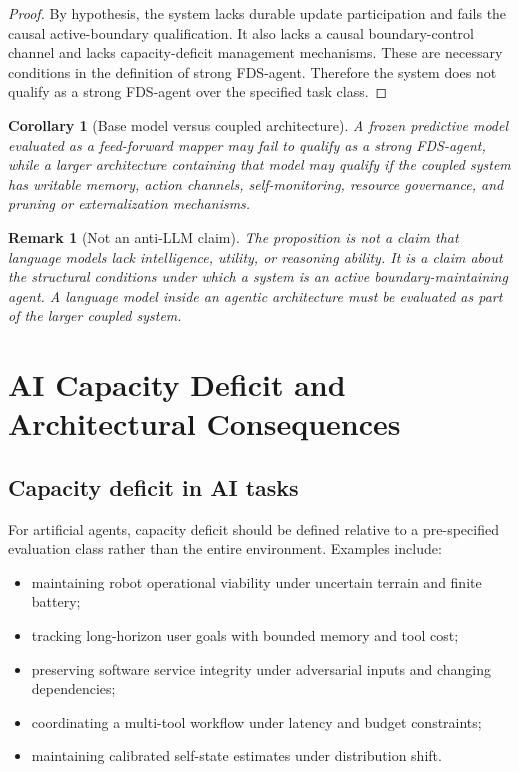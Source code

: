 \documentclass[10pt,a4paper,twocolumn,aps,prl]{revtex4-2}
\newtheorem{corollary}{Corollary}
\newtheorem{remark}{Remark}
\begin{document}
\begin{proof}
By hypothesis, the system lacks durable update participation and fails the causal active-boundary qualification. It also lacks a causal boundary-control channel and lacks capacity-deficit management mechanisms. These are necessary conditions in the definition of strong FDS-agent. Therefore the system does not qualify as a strong FDS-agent over the specified task class.
\end{proof}

\begin{corollary}[Base model versus coupled architecture]
A frozen predictive model evaluated as a feed-forward mapper may fail to qualify as a strong FDS-agent, while a larger architecture containing that model may qualify if the coupled system has writable memory, action channels, self-monitoring, resource governance, and pruning or externalization mechanisms.
\end{corollary}

\begin{remark}[Not an anti-LLM claim]
The proposition is not a claim that language models lack intelligence, utility, or reasoning ability. It is a claim about the structural conditions under which a system is an active boundary-maintaining agent. A language model inside an agentic architecture must be evaluated as part of the larger coupled system.
\end{remark}

\section{AI Capacity Deficit and Architectural Consequences}

\subsection{Capacity deficit in AI tasks}

For artificial agents, capacity deficit should be defined relative to a pre-specified evaluation class rather than the entire environment. Examples include:
\begin{itemize}[leftmargin=2em]
    \item maintaining robot operational viability under uncertain terrain and finite battery;
    \item tracking long-horizon user goals with bounded memory and tool cost;
    \item preserving software service integrity under adversarial inputs and changing dependencies;
    \item coordinating a multi-tool workflow under latency and budget constraints;
    \item maintaining calibrated self-state estimates under distribution shift.
\end{itemize}
\end{document}
